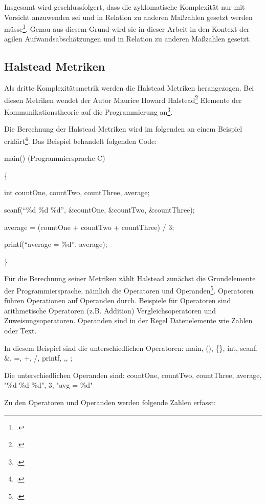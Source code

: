 Insgesamt wird geschlussfolgert, dass die zyklomatische Komplexität nur
mit Vorsicht anzuwenden sei und in Relation zu anderen Maßzahlen gesetzt
werden müsse\footcite[Vgl. ][]{(fentonSoftwareMetricsRigorous2003 S. 52).}. Genau
aus diesem Grund wird sie in dieser Arbeit in den Kontext der agilen
Aufwandsabschätzungen und in Relation zu anderen Maßzahlen gesetzt.

\subsection{Halstead Metriken}\label{Halstead-Metriken}

Als dritte Komplexitätsmetrik werden die Halstead Metriken herangezogen.
Bei diesen Metriken wendet der Autor Maurice Howard Halstead\footcite[Vgl. ][]{halsteadElementsSoftwareScience1979}
Elemente der Kommunikationstheorie auf die Programmierung an\footcite[Vgl. ][]{(Sneed
  et al 2010:183)}.

Die Berechnung der Halstead Metriken wird im folgenden an einem Beispiel
erklärt\footcite[Vgl. ][]{(Sneed et al 2010:184)}. Das Beispiel behandelt
folgenden Code:

main() (Programmiersprache C)

\{

int countOne, countTwo, countThree, average;

scanf(``\%d \%d \%d'', \&countOne, \&countTwo, \&countThree);

average = (countOne + countTwo + countThree) / 3;

printf(``average = \%d'', average);

\}

Für die Berechnung seiner Metriken zählt Halstead zunächst die
Grundelemente der Programmiersprache, nämlich die Operatoren und
Operanden\footcite[Vgl. ][]{(Sneed et al 2010:183), (Rumreich and Kecskemety
  2019:2)}. Operatoren führen Operationen auf Operanden durch. Beispiele
für Operatoren sind arithmetische Operatoren (z.B. Addition)
Vergleichsoperatoren und Zuweisungsoperatoren. Operanden sind in der
Regel Datenelemente wie Zahlen oder Text.

In diesem Beispiel sind die unterschiedlichen Operatoren: main, (),
\{\}, int, scanf, \&, =, +, /, printf, ,, ;

Die unterschiedlichen Operanden sind: countOne, countTwo, countThree,
average, "\%d \%d \%d", 3, "avg = \%d"

Zu den Operatoren und Operanden werden folgende Zahlen erfasst:

